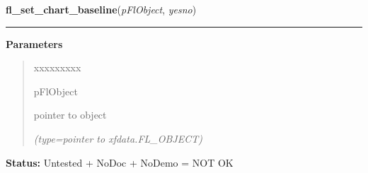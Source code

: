 \hspace{.8\funcindent}\begin{boxedminipage}{\funcwidth}

    \raggedright \textbf{fl\_set\_chart\_baseline}(\textit{pFlObject}, \textit{yesno})

    \vspace{-1.5ex}

    \rule{\textwidth}{0.5\fboxrule}
\setlength{\parskip}{2ex}
\setlength{\parskip}{1ex}
      \textbf{Parameters}
      \vspace{-1ex}

      \begin{quote}
        \begin{Ventry}{xxxxxxxxx}

          \item[pFlObject]

          pointer to object

            {\it (type=pointer to xfdata.FL\_OBJECT)}

        \end{Ventry}

      \end{quote}

\textbf{Status:} Untested + NoDoc + NoDemo = NOT OK



    \end{boxedminipage}

    \label{xformslib:flchart:fl_set_chart_lcolor}

    \vspace{0.5ex}

